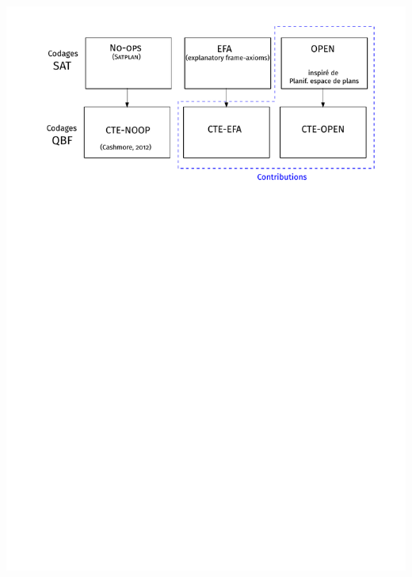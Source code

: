 \documentclass[english,french,usenames,dvipsnames]{beamer}
\begin{document}
\begin{frame}
\includegraphics[width=1\textwidth]{figures/coplas2018/cte-encodings-2.pdf}
\end{frame}
\end{document}
